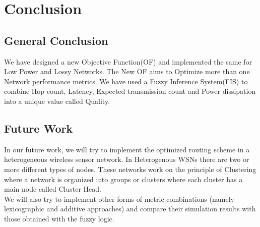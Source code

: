 \chapter{Conclusion} \label{Conclusion}
\section{General Conclusion} \label{General Conclusion}
We have designed a new Objective Function(OF) and implemented the same for Low Power and Lossy Networks. The New OF aims to Optimize more than one Network performance metrics. We have used a Fuzzy Inference System(FIS) to combine Hop count, Latency, Expected transmission count and Power dissipation into a unique value called Quality.
\section{Future Work} \label{Future Work}
In our future work, we will try to implement the optimized routing scheme in a heterogeneous wireless sensor network. In Heterogenous WSNs there are two or more different types of nodes. These networks work on the principle of Clustering where a network is organized into groups or clusters where each cluster has a main node called Cluster Head.\\
We will also try to implement other forms of metric combinations (namely lexicographic and additive approaches) and compare their simulation results with those obtained with the fuzzy logic.
